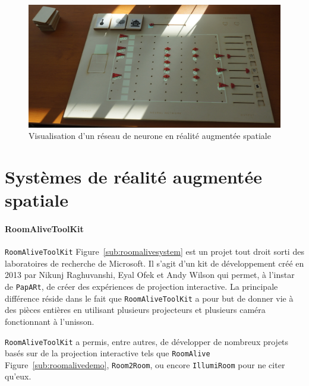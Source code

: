 \begin{figure}[H]
\centering
\includegraphics[width=0.65\linewidth]{images/neural-network}
\caption{Visualisation d'un réseau de neurone en réalité augmentée spatiale}
\label{fig:neuralnetwork}
\end{figure}


\section{Systèmes de réalité augmentée spatiale}
\label{sec:SARother}
\paragraph{RoomAliveToolKit} \texttt{RoomAliveToolKit}\cite{Jones:2014:RME:2642918.2647383} Figure~\ref{sub:roomalivesystem} est un projet tout droit sorti des laboratoires de recherche de Microsoft. Il s'agit d'un kit de développement créé en 2013 par Nikunj Raghuvanshi, Eyal Ofek et Andy Wilson qui permet, à l'instar de \texttt{\texttt{PapARt}}, de créer des expériences de projection interactive. La principale différence réside dans le fait que \texttt{RoomAliveToolKit} a pour but de donner vie à des pièces entières en utilisant plusieurs projecteurs et plusieurs caméra fonctionnant à l'unisson.

\texttt{RoomAliveToolKit} a permis, entre autres, de développer de nombreux projets basés sur de la projection interactive tels que \texttt{RoomAlive} Figure~\ref{sub:roomalivedemo}, \texttt{Room2Room}, ou encore \texttt{IllumiRoom} pour ne citer qu'eux.

